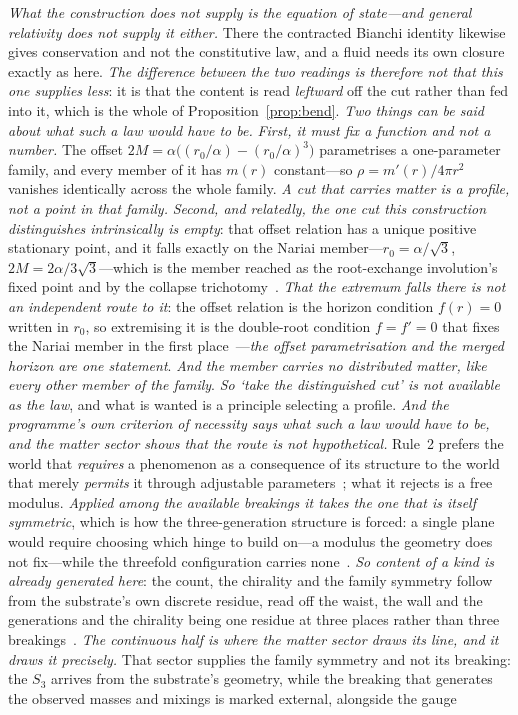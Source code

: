 \documentclass[11pt,a4paper]{article}
\theoremstyle{definition}
\begin{document}
\emph{What the construction does not supply is the equation of state---and general relativity does not
supply it either.} There the contracted Bianchi identity likewise gives conservation and not the
constitutive law, and a fluid needs its own closure exactly as here. \emph{The difference between the
two readings is therefore not that this one supplies less}: it is that the content is read
\emph{leftward} off the cut rather than fed into it, which is the whole of
Proposition~\ref{prop:bend}. \emph{Two things can be said about what such a law would have to be.} \emph{First, it must fix a function and not a number.} The offset $2M=\alpha\bigl((r_0/\alpha)-(r_0/\alpha)^{3}\bigr)$ parametrises a one-parameter family, and every member of it has $m(r)$ constant---so $\rho=m'(r)/4\pi r^{2}$ vanishes identically across the whole family. \emph{A cut that carries matter is a profile, not a point in that family.} \emph{Second, and relatedly, the one cut this construction distinguishes intrinsically is empty}: that offset relation has a unique positive stationary point, and it falls exactly on the Nariai member---$r_0=\alpha/\sqrt3$, $2M=2\alpha/3\sqrt3$---which is the member reached as the root-exchange involution's fixed point and by the collapse trichotomy~\cite{JanzenGroupoid,JanzenBHcausality}. \emph{That the extremum falls there is not an independent route to it}: the offset relation is the horizon condition $f(r)=0$ written in $r_0$, so extremising it is the double-root condition $f=f'=0$ that fixes the Nariai member in the first place~\cite{JanzenCRcosmology}---\emph{the offset parametrisation and the merged horizon are one statement}. \emph{And the member carries no distributed matter, like every other member of the family}. \emph{So `take the distinguished cut' is not available as the law}, and what is wanted is a principle selecting a profile. \emph{And the programme's own criterion of necessity says what such a law would have to be, and the matter sector shows that the route is not hypothetical.} Rule~2 prefers the world that \emph{requires} a phenomenon as a consequence of its structure to the world that merely \emph{permits} it through adjustable parameters~\cite{JanzenShadowExistence}; what it rejects is a free modulus. \emph{Applied among the available breakings it takes the one that is itself symmetric}, which is how the three-generation structure is forced: a single plane would require choosing which hinge to build on---a modulus the geometry does not fix---while the threefold configuration carries none~\cite{JanzenMatter}. \emph{So content of a kind is already generated here}: the count, the chirality and the family symmetry follow from the substrate's own discrete residue, read off the waist, the wall and the generations and the chirality being one residue at three places rather than three breakings~\cite{JanzenGeometricCore}. \emph{The continuous half is where the matter sector draws its line, and it draws it precisely.} That sector supplies the family symmetry and not its breaking: the $S_3$ arrives from the substrate's geometry, while the breaking that generates the observed masses and mixings is marked external, alongside the gauge 
\end{document}
